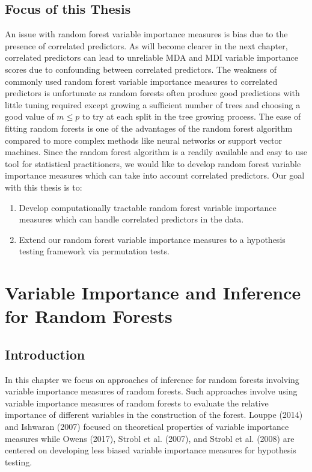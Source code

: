 \documentclass[12pt,twoside]{reedthesis}
\theoremstyle{definition}
\theoremstyle{definition}
\theoremstyle{definition}
\theoremstyle{remark}
\begin{document}
\section{Focus of this Thesis}\label{focus-of-this-thesis}

An issue with random forest variable importance measures is bias due to
the presence of correlated predictors. As will become clearer in the
next chapter, correlated predictors can lead to unreliable MDA and MDI
variable importance scores due to confounding between correlated
predictors. The weakness of commonly used random forest variable
importance measures to correlated predictors is unfortunate as random
forests often produce good predictions with little tuning required
except growing a sufficient number of trees and choosing a good value of
\(m\leq p\) to try at each split in the tree growing process. The ease
of fitting random forests is one of the advantages of the random forest
algorithm compared to more complex methods like neural networks or
support vector machines. Since the random forest algorithm is a readily
available and easy to use tool for statistical practitioners, we would
like to develop random forest variable importance measures which can
take into account correlated predictors. Our goal with this thesis is
to:
\begin{enumerate}
  \item Develop computationally tractable random forest variable importance measures which can handle correlated predictors in the data. 
  \item Extend our random forest variable importance measures to a hypothesis testing framework via permutation tests. 
  \end{enumerate}
\par

\chapter{Variable Importance and Inference for Random
Forests}\label{variable-importance-and-inference-for-random-forests}

\section{Introduction}\label{introduction-1}

In this chapter we focus on approaches of inference for random forests
involving variable importance measures of random forests. Such
approaches involve using variable importance measures of random forests
to evaluate the relative importance of different variables in the
construction of the forest. Louppe (2014) and Ishwaran (2007) focused on
theoretical properties of variable importance measures while Owens
(2017), Strobl et al. (2007), and Strobl et al. (2008) are centered on
developing less biased variable importance measures for hypothesis
testing. \par
\end{document}

